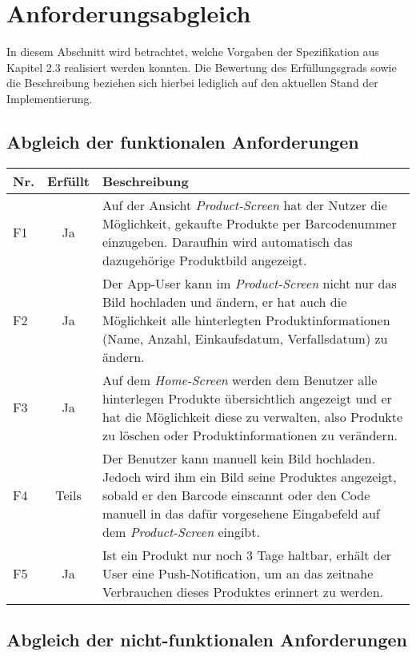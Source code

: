 \newpage
\section{Anforderungsabgleich}
In diesem Abschnitt wird betrachtet, welche Vorgaben der Spezifikation aus Kapitel 2.3 realisiert werden konnten. Die Bewertung des Erfüllungsgrads sowie die Beschreibung beziehen sich hierbei lediglich auf den aktuellen Stand der Implementierung.

\subsection{Abgleich der funktionalen Anforderungen}

\begin{tabular}{lcp{12.3cm}}
	\textbf{Nr.} & \textbf{Erfüllt} & \textbf{Beschreibung}\\
	\hline
	F1 & Ja & Auf der Ansicht \textit{Product-Screen} hat der Nutzer die Möglichkeit, gekaufte Produkte per Barcodenummer einzugeben. Daraufhin wird automatisch das dazugehörige Produktbild angezeigt.\\
	F2 & Ja &  Der App-User kann im \textit{Product-Screen} nicht nur das Bild hochladen und ändern, er hat auch die Möglichkeit alle hinterlegten Produktinformationen (Name, Anzahl, Einkaufsdatum, Verfallsdatum) zu ändern.\\
	F3 & Ja &  Auf dem \textit{Home-Screen} werden dem Benutzer alle hinterlegen Produkte übersichtlich angezeigt und er hat die Möglichkeit diese zu verwalten, also Produkte zu löschen oder Produktinformationen zu verändern.\\
	F4 & Teils &  Der Benutzer kann manuell kein Bild hochladen. Jedoch wird ihm ein Bild seine Produktes angezeigt, sobald er den Barcode einscannt oder den Code manuell in das dafür vorgesehene Eingabefeld auf dem \textit{Product-Screen} eingibt.\\
	F5 & Ja &  Ist ein Produkt nur noch 3 Tage haltbar, erhält der User eine Push-Notification, um an das zeitnahe Verbrauchen dieses Produktes erinnert zu werden.\\
	\hline
\end{tabular}

\subsection{Abgleich der nicht-funktionalen Anforderungen}

